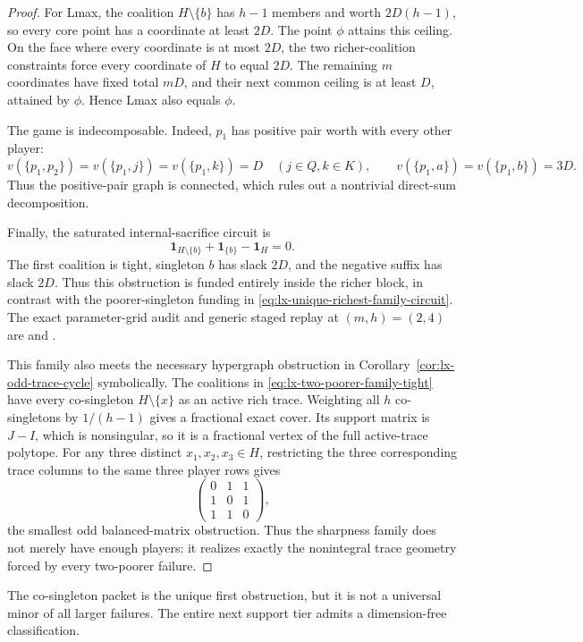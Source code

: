 \begin{proof}
For Lmax, the coalition $H\setminus\{b\}$ has $h-1$ members and worth
$2D(h-1)$, so every core point has a coordinate at least $2D$.  The point
$\phi$ attains this ceiling.  On the face where every coordinate is at most
$2D$, the two richer-coalition constraints force every coordinate of $H$ to
equal $2D$.  The remaining $m$ coordinates have fixed total $mD$, and their
next common ceiling is at least $D$, attained by $\phi$.  Hence Lmax also
equals $\phi$.

The game is indecomposable.  Indeed, $p_1$ has positive pair worth with
every other player:
\[
 v(\{p_1,p_2\})=v(\{p_1,j\})=v(\{p_1,k\})=D
 \quad(j\in Q,k\in K),
 \qquad
 v(\{p_1,a\})=v(\{p_1,b\})=3D.
\]
Thus the positive-pair graph is connected, which rules out a nontrivial
direct-sum decomposition.

Finally, the saturated internal-sacrifice circuit is
\[
 \mathbf1_{H\setminus\{b\}}+\mathbf1_{\{b\}}
 -\mathbf1_H=0.                                      \tag{TF-C}
\]
The first coalition is tight, singleton $b$ has slack $2D$, and the negative
suffix has slack $2D$.  Thus this obstruction is funded entirely inside the
richer block, in contrast with the poorer-singleton funding in
\eqref{eq:lx-unique-richest-family-circuit}.  The exact parameter-grid audit
and generic staged replay at $(m,h)=(2,4)$ are
 and
.

This family also meets the necessary hypergraph obstruction in
Corollary~\ref{cor:lx-odd-trace-cycle} symbolically.  The coalitions in
\eqref{eq:lx-two-poorer-family-tight} have every co-singleton
$H\setminus\{x\}$ as an active rich trace.  Weighting all $h$ co-singletons
by $1/(h-1)$ gives a fractional exact cover.  Its support matrix is $J-I$,
which is nonsingular, so it is a fractional vertex of the full active-trace
polytope.  For any three distinct
$x_1,x_2,x_3\in H$, restricting the three corresponding trace columns to
the same three player rows gives
\[
 \begin{pmatrix}0&1&1\\1&0&1\\1&1&0\end{pmatrix},
\]
the smallest odd balanced-matrix obstruction.  Thus the sharpness family does
not merely have enough players: it realizes exactly the nonintegral trace
geometry forced by every two-poorer failure.
\end{proof}

The co-singleton packet is the unique first obstruction, but it is not a
universal minor of all larger failures.  The entire next support tier admits
a dimension-free classification.


